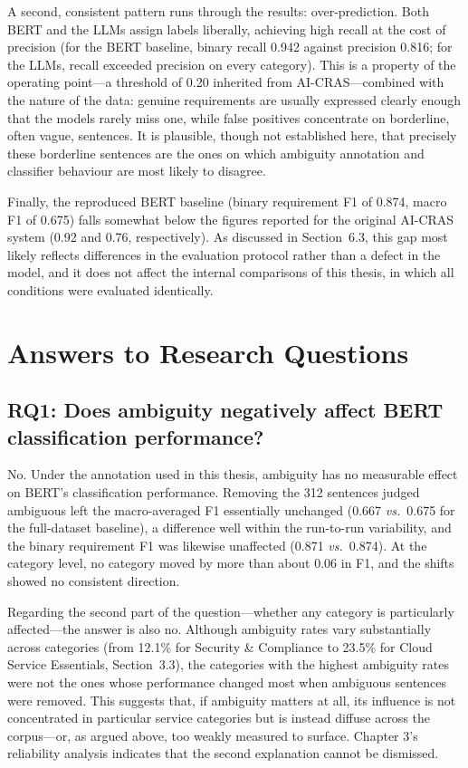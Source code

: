 A second, consistent pattern runs through the results: over-prediction. Both BERT and the LLMs assign labels liberally, achieving high recall at the cost of precision (for the BERT baseline, binary recall 0.942 against precision 0.816; for the LLMs, recall exceeded precision on every category). This is a property of the operating point---a threshold of 0.20 inherited from AI-CRAS---combined with the nature of the data: genuine requirements are usually expressed clearly enough that the models rarely miss one, while false positives concentrate on borderline, often vague, sentences. It is plausible, though not established here, that precisely these borderline sentences are the ones on which ambiguity annotation and classifier behaviour are most likely to disagree.

Finally, the reproduced BERT baseline (binary requirement F1 of 0.874, macro F1 of 0.675) falls somewhat below the figures reported for the original AI-CRAS system (0.92 and 0.76, respectively). As discussed in Section~6.3, this gap most likely reflects differences in the evaluation protocol rather than a defect in the model, and it does not affect the internal comparisons of this thesis, in which all conditions were evaluated identically.

\section{Answers to Research Questions}

\subsection{RQ1: Does ambiguity negatively affect BERT classification performance?}

No. Under the annotation used in this thesis, ambiguity has no measurable effect on BERT's classification performance. Removing the 312 sentences judged ambiguous left the macro-averaged F1 essentially unchanged (0.667 \textit{vs.}~0.675 for the full-dataset baseline), a difference well within the run-to-run variability, and the binary requirement F1 was likewise unaffected (0.871 \textit{vs.}~0.874). At the category level, no category moved by more than about 0.06 in F1, and the shifts showed no consistent direction.

Regarding the second part of the question---whether any category is particularly affected---the answer is also no. Although ambiguity rates vary substantially across categories (from 12.1\% for Security \& Compliance to 23.5\% for Cloud Service Essentials, Section~3.3), the categories with the highest ambiguity rates were not the ones whose performance changed most when ambiguous sentences were removed. This suggests that, if ambiguity matters at all, its influence is not concentrated in particular service categories but is instead diffuse across the corpus---or, as argued above, too weakly measured to surface. Chapter 3's reliability analysis indicates that the second explanation cannot be dismissed.

